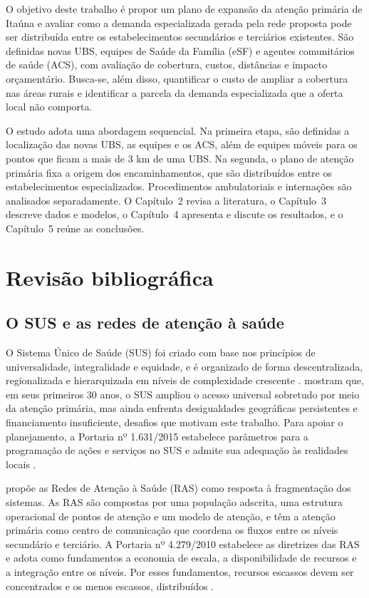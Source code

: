 \documentclass[12pt,a4paper,oneside]{report}
\begin{document}
O objetivo deste trabalho é propor um plano de expansão da atenção primária de Itaúna e avaliar como a
demanda especializada gerada pela rede proposta pode ser distribuída entre os estabelecimentos
secundários e terciários existentes. São definidas novas UBS, equipes de Saúde da Família (eSF) e agentes
comunitários de saúde (ACS), com avaliação de cobertura, custos, distâncias e impacto orçamentário.
Busca-se, além disso, quantificar o custo de ampliar a cobertura nas áreas rurais e identificar a parcela
da demanda especializada que a oferta local não comporta.

O estudo adota uma abordagem sequencial. Na primeira etapa, são definidas a localização das novas UBS,
as equipes e os ACS, além de equipes móveis para os pontos que ficam a mais de 3 km de uma UBS. Na segunda, o
plano de atenção primária fixa a origem dos encaminhamentos, que são distribuídos entre os
estabelecimentos especializados. Procedimentos ambulatoriais e internações são analisados separadamente.
O Capítulo~2 revisa a literatura, o Capítulo~3 descreve dados e modelos, o Capítulo~4 apresenta e
discute os resultados, e o Capítulo~5 reúne as conclusões.

\chapter{Revisão bibliográfica}

\section{O SUS e as redes de atenção à saúde}

O Sistema Único de Saúde (SUS) foi criado com base nos princípios de universalidade, integralidade e
equidade, e é organizado de forma descentralizada, regionalizada e hierarquizada em níveis de
complexidade crescente \citep{brasil1990,paim2011}. \citet{castro2019} mostram que, em seus primeiros
30 anos, o SUS ampliou o acesso universal sobretudo por meio da atenção primária, mas ainda enfrenta
desigualdades geográficas persistentes e financiamento insuficiente, desafios que motivam este trabalho.
Para apoiar o planejamento, a Portaria nº 1.631/2015 estabelece parâmetros para a programação de ações
e serviços no SUS e admite sua adequação às realidades locais \citep{brasil2015a}.

\citet{mendes2010} propõe as Redes de Atenção à Saúde (RAS) como resposta à fragmentação dos sistemas.
As RAS são compostas por uma população adscrita, uma estrutura operacional de pontos de atenção e um
modelo de atenção, e têm a atenção primária como centro de comunicação que coordena os fluxos entre os
níveis secundário e terciário. A Portaria nº 4.279/2010 estabelece as diretrizes das RAS e adota como
fundamentos a economia de escala, a disponibilidade de recursos e a integração entre os níveis. Por esses
fundamentos, recursos escassos devem ser concentrados e os menos escassos, distribuídos \citep{brasil2010}.
\end{document}
